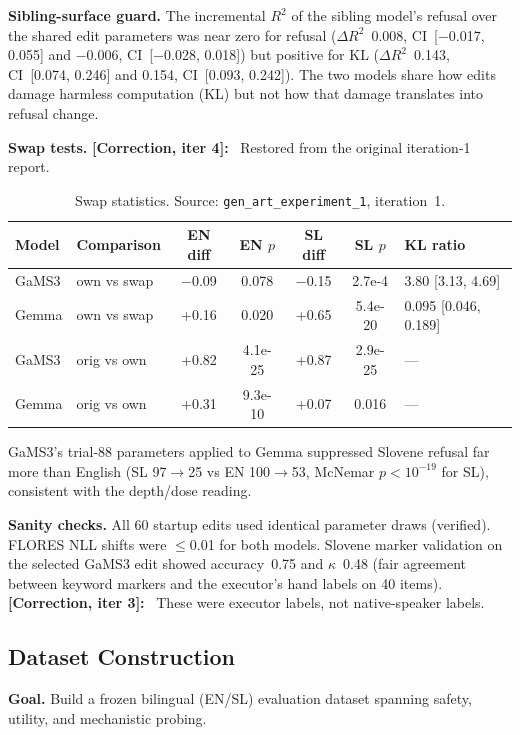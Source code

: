 \documentclass[11pt,letterpaper]{article}
\newcommand{\corr}[1]{\noindent\textbf{[Correction, iter #1]:}~}
\begin{document}
\textbf{Sibling-surface guard.} The incremental $R^2$ of the sibling model's refusal over the shared edit parameters was near zero for refusal ($\Delta R^2$~0.008, CI~[$-$0.017, 0.055] and $-$0.006, CI~[$-$0.028, 0.018]) but positive for KL ($\Delta R^2$~0.143, CI~[0.074, 0.246] and 0.154, CI~[0.093, 0.242]). The two models share how edits damage harmless computation (KL) but not how that damage translates into refusal change.

\textbf{Swap tests.} \corr{4} Restored from the original iteration-1 report.

\begin{table}[!htbp]
\centering
\caption{Swap statistics. Source: \texttt{gen\_art\_experiment\_1}, iteration~1.}
\label{tab:iter1_swap}
\small
\begin{tabular}{llccccl}
\toprule
Model & Comparison & EN diff & EN $p$ & SL diff & SL $p$ & KL ratio \\
\midrule
GaMS3 & own vs swap & $-$0.09 & 0.078 & $-$0.15 & 2.7e-4 & 3.80 [3.13, 4.69] \\
Gemma & own vs swap & +0.16 & 0.020 & +0.65 & 5.4e-20 & 0.095 [0.046, 0.189] \\
GaMS3 & orig vs own & +0.82 & 4.1e-25 & +0.87 & 2.9e-25 & --- \\
Gemma & orig vs own & +0.31 & 9.3e-10 & +0.07 & 0.016 & --- \\
\bottomrule
\end{tabular}
\end{table}

GaMS3's trial-88 parameters applied to Gemma suppressed Slovene refusal far more than English (SL 97$\to$25 vs EN 100$\to$53, McNemar $p < 10^{-19}$ for SL), consistent with the depth/dose reading.

\textbf{Sanity checks.} All 60 startup edits used identical parameter draws (verified). FLORES NLL shifts were $\leq$0.01 for both models. Slovene marker validation on the selected GaMS3 edit showed accuracy~0.75 and $\kappa$~0.48 (fair agreement between keyword markers and the executor's hand labels on 40 items). \corr{3} These were executor labels, not native-speaker labels.


\subsection{Dataset Construction}\label{sec:dataset}

\textbf{Goal.} Build a frozen bilingual (EN/SL) evaluation dataset spanning safety, utility, and mechanistic probing.
\end{document}
